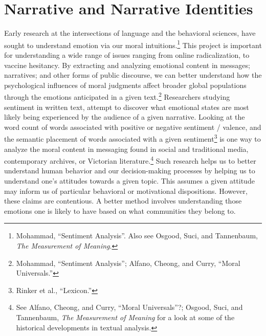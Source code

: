 \documentclass[
  12pt,
]{book}
\theoremstyle{definition}
\theoremstyle{definition}
\theoremstyle{definition}
\theoremstyle{definition}
\theoremstyle{remark}
\begin{document}
\section{Narrative and Narrative Identities}\label{narrative-and-narrative-identities-1}

Early research at the intersections of language and the behavioral sciences, have sought to understand emotion via our moral intuitions.\footnote{Mohammad, {``Sentiment {Analysis}''}. Also see Osgood, Suci, and Tannenbaum, \emph{The Measurement of Meaning}.} This project is important for understanding a wide range of issues ranging from online radicalization, to vaccine hesitancy. By extracting and analyzing emotional content in messages; narratives; and other forms of public discourse, we can better understand how the psychological influences of moral judgments affect broader global populations through the emotions anticipated in a given text.\footnote{Mohammad, {``Sentiment {Analysis}''}; Alfano, Cheong, and Curry, {``Moral {Universals}.''}} Researchers studying sentiment in written text, attempt to discover what emotional states are most likely being experienced by the audience of a given narrative. Looking at the word count of words associated with positive or negative sentiment / valence, and the semantic placement of words associated with a given sentiment\footnote{Rinker et al., {``Lexicon.''}} is one way to analyze the moral content in messaging found in social and traditional media, contemporary archives, or Victorian literature.\footnote{See Alfano, Cheong, and Curry, {``Moral {Universals}''}?; Osgood, Suci, and Tannenbaum, \emph{The Measurement of Meaning} for a look at some of the historical developments in textual analysis.} Such research helps us to better understand human behavior and our decision-making processes by helping us to understand one's attitudes towards a given topic. This assumes a given attitude may inform us of particular behavioral or motivational dispositions. However, these claims are contentious. A better method involves understanding those emotions one is likely to have based on what communities they belong to.
\end{document}
